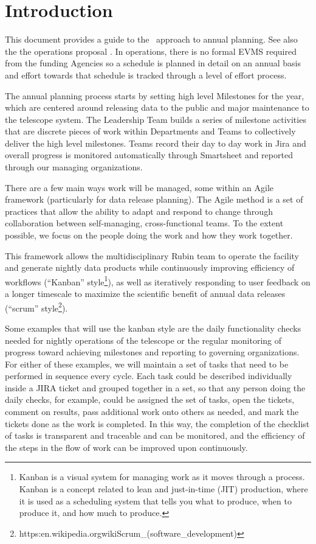 \section{Introduction}


This document provides a guide to the \VRO \   approach to annual planning.
See also the the operations proposal .
In operations, there is no formal \gls{EVMS} required from the funding Agencies so a schedule is planned in detail on an annual basis and effort towards that schedule is tracked through a level of effort process.

The annual planning process starts by setting high level Milestones for the year, which are centered around releasing data to the public and major maintenance to the telescope system. The Leadership Team builds a series of milestone activities that are discrete pieces of work within Departments and Teams to collectively deliver the high level milestones.  Teams record their day to day work in Jira and overall progress is monitored automatically through Smartsheet and reported through our managing organizations. 

There are a few main ways work will be managed, some within an Agile framework (particularly for data release planning). 
The Agile method is a set of practices that allow the ability to adapt and respond to change through collaboration between self-managing, cross-functional teams.  
To the extent possible, we focus on the people doing the work and how they work together. 

This framework allows the multidisciplinary Rubin team to operate the facility and generate nightly data products while continuously improving efficiency of workflows (``Kanban'' style\footnote{Kanban is a visual system for managing work as it moves through a process. 
Kanban is a concept related to lean and just-in-time (JIT) production, where it is used as a scheduling system that tells you what to produce, when to produce it, and how much to produce.}), 
as well as iteratively responding to user feedback on a longer timescale to maximize the scientific benefit of annual data releases (``scrum'' style\footnote{https:\/\/en.wikipedia.org\/wiki\/Scrum\_(software\_development)}).  

Some examples that will use the kanban style are the daily functionality checks needed for nightly operations of the telescope or the regular monitoring of progress toward achieving milestones and reporting to governing organizations.
For either of these examples, we will maintain a set of tasks that need to be performed in sequence every cycle.
Each task could be described individually inside a JIRA ticket and grouped together in a set, so that any person doing the daily checks, for example, could be assigned the set of tasks, open the tickets, comment on results, pass additional work onto others as needed, and mark the tickets done as the work is completed.
In this way, the completion of the checklist of tasks is transparent and traceable and can be monitored, and the efficiency of the steps in the flow of work can be improved upon continuously.

